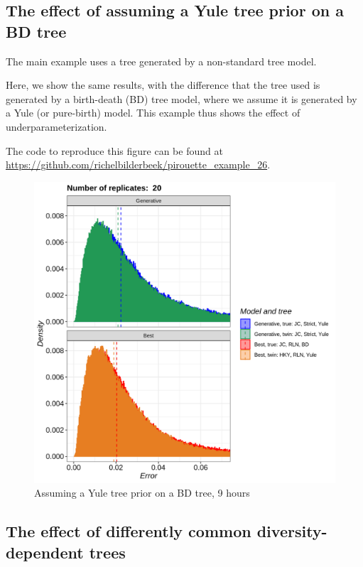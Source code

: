 \subsection{The effect of assuming a Yule tree prior on a BD tree}
\label{subsec:under_parameterization}

The main example uses a tree generated by a non-standard tree model.

Here, we show the same results, with the difference that
the tree used is generated by a birth-death (BD) tree model,
where we assume it is generated by a Yule (or pure-birth) model.
This example thus shows the effect of underparameterization.

The code to reproduce this figure can be found at  
\url{https://github.com/richelbilderbeek/pirouette_example_26}.

\begin{figure}[H]
  \includegraphics[width=\textwidth]{pirouette_example_26/errors.png}
  \caption{Assuming a Yule tree prior on a BD tree, 9 hours}
\end{figure}

\subsection{The effect of differently common diversity-dependent trees}
\label{subsec:better_label_needed}

